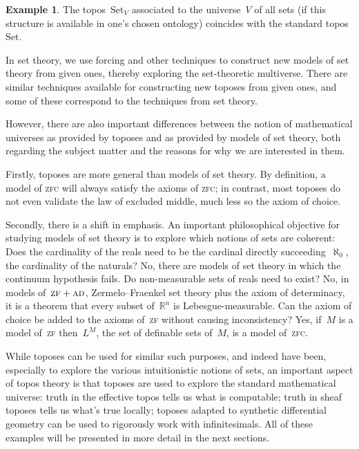 \documentclass[oneside]{amsart}
\theoremstyle{definition}
\newtheorem{ex}[defn]{Example}
\theoremstyle{plain}
\theoremstyle{remark}
\newcommand{\RR}{\mathbb{R}}
\newcommand{\Set}{\mathrm{Set}}
\renewcommand{\_}{\mathpunct{.}\,}
\newcommand{\effective}{ef{}fective\xspace}
\newcommand{\?}{\,{:}\,}
\begin{document}
\begin{ex}The topos~$\Set_V$ associated to the universe~$V$ of all sets (if
this structure is available in one's chosen ontology) coincides with the
standard topos~$\Set$.\end{ex}

In set theory, we use forcing and other techniques to construct new
models of set theory from given ones, thereby exploring the set-theoretic
multiverse. There are similar techniques available for constructing new toposes
from given ones, and some of these correspond to the techniques from set
theory.

However, there are also important differences between the notion of mathematical
universes as provided by toposes and as provided by models of set theory, both
regarding the subject matter and the reasons for why we are interested in them.

Firstly, toposes are more general than models of set theory. By definition, a
model of \textsc{zfc} will always satisfy the axioms of \textsc{zfc}; in
contrast, most toposes do not even validate the law of excluded middle, much
less so the axiom of choice.

Secondly, there is a shift in emphasis. An important philosophical objective
for studying models of set theory is to explore which notions of sets are
coherent: Does the cardinality of the reals need to be the cardinal directly
succeeding~$\aleph_0$, the cardinality of the naturals? No, there are models of
set theory in which the continuum hypothesis fails. Do non-measurable sets of
reals need to exist? No, in models of~$\textsc{zf}+\textsc{ad}$,
Zermelo--Fraenkel set theory plus the axiom of determinacy, it is a theorem that
every subset of~$\RR^n$ is Lebesgue-measurable. Can the axiom of choice be
added to the axioms of~\textsc{zf} without causing inconsistency? Yes, if~$M$
is a model of~\textsc{zf} then~$L^M$, the set of definable sets of~$M$, is a
model of~\textsc{zfc}.  %

While toposes can be used for similar such purposes, and indeed have been,
especially to explore the various intuitionistic notions of sets, an important
aspect of topos theory is that toposes are used to explore the standard
mathematical universe: truth in the \effective topos tells us what is
computable; truth in sheaf toposes tells us what's true locally; toposes
adapted to synthetic differential geometry can be used to rigorously work with
infinitesimals. All of these examples will be presented in more detail in the
next sections.
\end{document}

